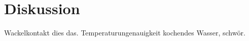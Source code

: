 \section{Diskussion}
\label{sec:Diskussion}
Wackelkontakt dies das.
Temperaturungenauigkeit kochendes Wasser, schwör.
